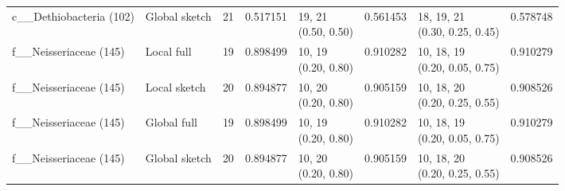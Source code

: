 \begin{longtable}{lllr lrlr}
c\_\_Dethiobacteria (102) & Global sketch & 21 & 0.517151 & \shortstack[l]{19, 21\\(0.50, 0.50)} & 0.561453 & \shortstack[l]{18, 19, 21\\(0.30, 0.25, 0.45)} & 0.578748 \\
f\_\_Neisseriaceae (145) & Local full & 19 & 0.898499 & \shortstack[l]{10, 19\\(0.20, 0.80)} & 0.910282 & \shortstack[l]{10, 18, 19\\(0.20, 0.05, 0.75)} & 0.910279 \\
f\_\_Neisseriaceae (145) & Local sketch & 20 & 0.894877 & \shortstack[l]{10, 20\\(0.20, 0.80)} & 0.905159 & \shortstack[l]{10, 18, 20\\(0.20, 0.25, 0.55)} & 0.908526 \\
f\_\_Neisseriaceae (145) & Global full & 19 & 0.898499 & \shortstack[l]{10, 19\\(0.20, 0.80)} & 0.910282 & \shortstack[l]{10, 18, 19\\(0.20, 0.05, 0.75)} & 0.910279 \\
f\_\_Neisseriaceae (145) & Global sketch & 20 & 0.894877 & \shortstack[l]{10, 20\\(0.20, 0.80)} & 0.905159 & \shortstack[l]{10, 18, 20\\(0.20, 0.25, 0.55)} & 0.908526 \\
\bottomrule
\end{longtable}
